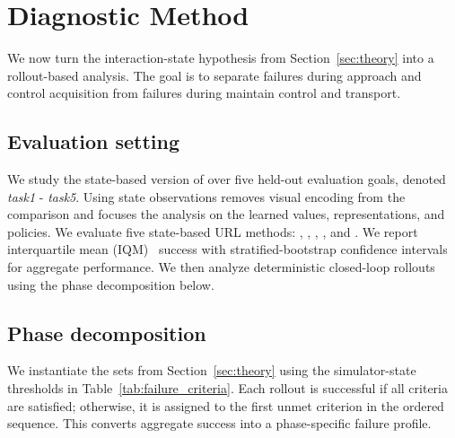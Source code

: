 \section{Diagnostic Method}
\label{sec:method}

We now turn the interaction-state hypothesis from Section~\ref{sec:theory} into a rollout-based analysis.
The goal is to separate failures during approach and control acquisition from failures during maintain control and transport.

\subsection{Evaluation setting}

We study the state-based version of \ogbench{} \task{} over five held-out evaluation goals, denoted \textit{task1} - \textit{task5}.
Using state observations removes visual encoding from the comparison and focuses the analysis on the learned values, representations, and policies.
We evaluate five state-based URL methods: \gciql{}, \crl{}, \fb{}, \rldp{}, and \psm{}.
We report interquartile mean (IQM)~\citep{agarwal-neurips21a} success with stratified-bootstrap confidence intervals for aggregate performance.
We then analyze deterministic closed-loop rollouts using the phase decomposition below.

\subsection{Phase decomposition}

We instantiate the sets from Section~\ref{sec:theory} using the simulator-state thresholds in Table~\ref{tab:failure_criteria}.
Each rollout is successful if all criteria are satisfied; otherwise, it is assigned to the first unmet criterion in the ordered sequence.
This converts aggregate success into a phase-specific failure profile.

